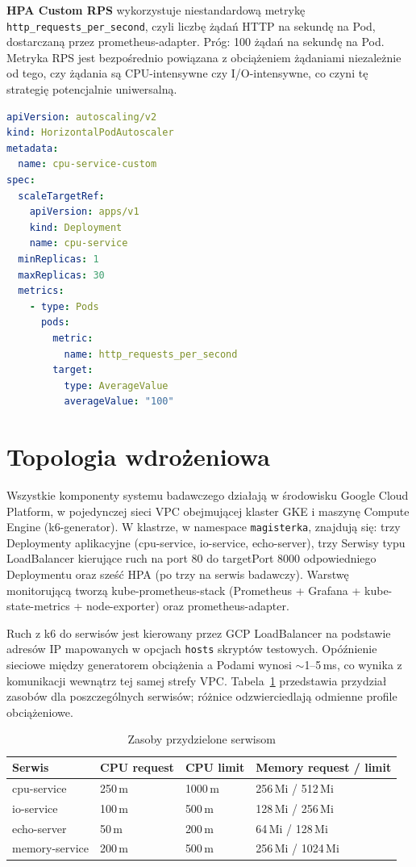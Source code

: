 \textbf{HPA Custom RPS} wykorzystuje niestandardową metrykę \texttt{http\_requests\_per\_second}, czyli liczbę żądań HTTP na sekundę na Pod, dostarczaną przez prometheus-adapter. Próg: 100 żądań na sekundę na Pod. Metryka RPS jest bezpośrednio powiązana z obciążeniem żądaniami niezależnie od tego, czy żądania są CPU-intensywne czy I/O-intensywne, co czyni tę strategię potencjalnie uniwersalną.

\begin{lstlisting}[language=yaml, caption={Przykładowa konfiguracja HPA Custom RPS}, label={lst:hpa-custom-config}]
apiVersion: autoscaling/v2
kind: HorizontalPodAutoscaler
metadata:
  name: cpu-service-custom
spec:
  scaleTargetRef:
    apiVersion: apps/v1
    kind: Deployment
    name: cpu-service
  minReplicas: 1
  maxReplicas: 30
  metrics:
    - type: Pods
      pods:
        metric:
          name: http_requests_per_second
        target:
          type: AverageValue
          averageValue: "100"
\end{lstlisting}

\section{Topologia wdrożeniowa}

Wszystkie komponenty systemu badawczego działają w środowisku Google Cloud Platform, w pojedynczej sieci VPC obejmującej klaster GKE i maszynę Compute Engine (k6-generator). W klastrze, w namespace \texttt{magisterka}, znajdują się: trzy Deploymenty aplikacyjne (cpu-service, io-service, echo-server), trzy Serwisy typu LoadBalancer kierujące ruch na port 80 do targetPort 8000 odpowiedniego Deploymentu oraz sześć HPA (po trzy na serwis badawczy). Warstwę monitorującą tworzą kube-prometheus-stack (Prometheus + Grafana + kube-state-metrics + node-exporter) oraz prometheus-adapter.

Ruch z k6 do serwisów jest kierowany przez GCP LoadBalancer na podstawie adresów IP mapowanych w opcjach \texttt{hosts} skryptów testowych. Opóźnienie sieciowe między generatorem obciążenia a Podami wynosi $\sim$1--5\,ms, co wynika z komunikacji wewnątrz tej samej strefy VPC. Tabela~\ref{tab:resource-allocation} przedstawia przydział zasobów dla poszczególnych serwisów; różnice odzwierciedlają odmienne profile obciążeniowe.

\begin{table}[H]
  \centering
  \begin{tabularx}{\textwidth}{|l|X|X|X|}
    \hline
    \textbf{Serwis} & \textbf{CPU request} & \textbf{CPU limit} & \textbf{Memory request / limit} \\
    \hline
    cpu-service & 250\,m & 1000\,m & 256\,Mi / 512\,Mi \\
    io-service & 100\,m & 500\,m & 128\,Mi / 256\,Mi \\
    echo-server & 50\,m & 200\,m & 64\,Mi / 128\,Mi \\
    memory-service & 200\,m & 500\,m & 256\,Mi / 1024\,Mi \\
    \hline
  \end{tabularx}
  \caption{Zasoby przydzielone serwisom}
  \label{tab:resource-allocation}
\end{table}

